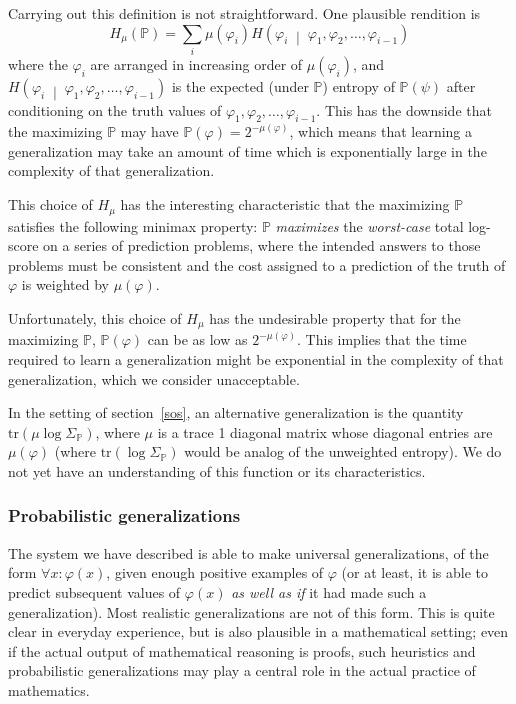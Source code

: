 \documentclass[12pt]{article}
\theoremstyle{definition}
\newcommand{\Hc}[2]{H\ofc{#1}{#2}}
\newcommand{\tr}[1]{\text{tr}\of{#1}}
\newcommand{\of}[1]{\left(#1\right)}
\newcommand{\ofc}[2]{\left(#1\;\middle\vert\;#2\right)}
\newcommand{\PP}{\mathbb{P}}
\newcommand{\muv}{\mu\of{\vp}}
\renewcommand{\P}[1]{\mathbb{P}\of{#1}}
\newcommand{\vp}{\varphi}
\begin{document}
Carrying out this definition is not straightforward. One plausible rendition is
\[ H_{\mu}\of{\PP} = \sum_{i} \mu\of{\vp_i} \Hc{\vp_i}{\vp_1, \vp_2, \ldots, \vp_{i-1}} \]
where the $\vp_i$ are arranged in increasing order of $\mu\of{\vp_i}$,
and $\Hc{\vp_i}{\vp_1, \vp_2, \ldots, \vp_{i-1}}$ is the expected (under $\PP$) entropy of $\P{\psi}$ after conditioning on the
truth values of $\vp_1, \vp_2, \ldots, \vp_{i-1}$.
This has the downside that the maximizing $\PP$ may have $\P{\vp} = 2^{- \muv}$,
which means that learning a generalization may take an amount of time
which is exponentially large in the complexity of that generalization.

This choice of $H_{\mu}$ has the interesting
characteristic that the maximizing $\PP$ satisfies the following minimax property:
$\PP$ \emph{maximizes} the \emph{worst-case} total log-score on a series of prediction
problems, where the intended answers to those problems must be consistent
and the cost assigned to a prediction of the truth of $\vp$
is weighted by $\mu\of{\vp}$.

Unfortunately, this choice of $H_{\mu}$ has the undesirable property
that for the maximizing $\PP$, $\P{\vp}$ can be as low as $2^{- \muv}$.
This implies that the time required to learn a generalization
might be exponential in the complexity of that generalization,
which we consider unacceptable.

In the setting of section~\ref{sos}, an alternative generalization
is the quantity $\tr{\mu \log \Sigma_{\PP}}$, where $\mu$ is a trace
1 diagonal matrix whose diagonal entries are $\muv$
(where $\tr{\log \Sigma_{\PP}}$ would be analog of the unweighted entropy).
We do not yet have an understanding of this function or its characteristics.


\subsubsection{Probabilistic generalizations}

The system we have described is able to make universal generalizations,
of the form $\forall x : \vp\of{x}$, given enough
positive examples of $\vp$ (or at least, it is able to predict
subsequent values of $\vp\of{x}$ \emph{as well as if} it had made such a generalization).
Most realistic generalizations are not of this form.
This is quite clear in everyday experience,
but is also plausible in a mathematical setting;
even if the actual output of mathematical reasoning is proofs,
such heuristics and probabilistic generalizations may play a central role
in the actual practice of mathematics.
\end{document}
